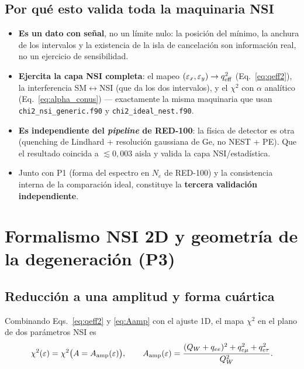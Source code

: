\documentclass[11pt,a4paper]{article}
\newcommand{\eps}{\varepsilon}
\newcommand{\QW}{Q_{W}}
\newcommand{\Ne}{N_{e}}
\newcommand{\qeff}{q_{\rm eff}}
\newcommand{\Aamp}{A_{\rm amp}}
\newcommand{\code}[1]{\texttt{#1}}
\begin{document}
\subsection{Por qu\'e esto valida toda la maquinaria NSI}
\label{sec:conus_why}

\begin{itemize}\itemsep2pt
  \item \textbf{Es un dato con se\~nal}, no un l\'imite nulo: la posici\'on del
    m\'inimo, la anchura de los intervalos y la existencia de la isla de
    cancelaci\'on son informaci\'on real, no un ejercicio de sensibilidad.
  \item \textbf{Ejercita la capa NSI completa}: el mapeo
    $(\eps_{x},\eps_{y})\to \qeff^{2}$ (Eq.~\eqref{eq:qeff2}), la interferencia
    SM$\leftrightarrow$NSI (que da los dos intervalos), y el $\chi^{2}$ con
    $\alpha$ anal\'itico (Eq.~\eqref{eq:alpha_conus}) --- exactamente la misma
    maquinaria que usan \code{chi2\_nsi\_generic.f90} y
    \code{chi2\_ideal\_nest.f90}.
  \item \textbf{Es independiente del \emph{pipeline} de RED-100}: la f\'isica de
    detector es otra (quenching de Lindhard + resoluci\'on gaussiana de Ge, no
    NEST + PE). Que el resultado coincida a $\lesssim 0{,}003$ aisla y valida la
    capa NSI/estad\'istica.
  \item Junto con P1 (forma del espectro en $\Ne$ de RED-100) y la consistencia interna de
    la comparaci\'on ideal, constituye la \textbf{tercera validaci\'on
    independiente}.
\end{itemize}

\section{Formalismo NSI 2D y geometr\'ia de la degeneraci\'on (P3)}
\label{sec:nsi}

\subsection{Reducci\'on a una amplitud y forma cu\'artica}
\label{sec:reduccion}

Combinando Eqs.~\eqref{eq:qeff2} y \eqref{eq:Aamp} con el ajuste 1D, el mapa
$\chi^{2}$ en el plano de dos par\'ametros NSI es
\begin{equation}
  \label{eq:chi2_nsi}
  \chi^{2}(\eps) = \chi^{2}\bigl(A = \Aamp(\eps)\bigr),
  \qquad
  \Aamp(\eps) = \frac{(\QW + q_{ee})^{2} + q_{e\mu}^{2} + q_{e\tau}^{2}}
                     {\QW^{2}} .
\end{equation}
\end{document}
